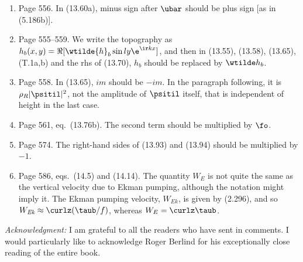 \documentclass[10pt]{article}
\newcommand{\eq}{eq.\ } \newcommand{\Eq}{Eq.\ }
\begin{document}
\begin{enumerate}

\item Page 556. In  (13.60a), minus sign after $\ubar$ should be plus sign [as in (5.186b)].

\item Page 555--559. We write the topography as $h_b(x,y)= \Re [ \wtilde{h}_b \sin ly \e^{\ir kx} ]$, and then in (13.55), (13.58), (13.65), (T.1a,b) and the rhs of (13.70), $h_b$ should be replaced by $\wtilde h_b$.

\item Page 558. In (13.65), $im$ should be $-im$. In the paragraph following,
   it is $\rho_R |\psitil|^2$, not the amplitude of $\psitil$ itself, that is independent of height in the last case. 

\item Page 561, \eq (13.76b). The second term should be multiplied by $\fo$. 

\item Page 574. The right-hand sides of (13.93) and (13.94) should be multiplied by $-1$.

\item Page 586, eqs.\ (14.5) and (14.14). The quantity $W_E$ is not quite the same as the vertical velocity due to Ekman pumping, although the notation might imply it. The Ekman pumping velocity, $W_{\textit{Ek}}$, is given by (2.296), and so $W_{\textit{Ek}} \approx \curlz (\taub/f)$, whereas $W_E = \curlz \taub$.  
 


\end{enumerate}

\noindent \textit{Acknowledgment:} I am grateful to all the readers who have sent in comments. I would particularly like to acknowledge Roger Berlind for his exceptionally close reading of the entire book.
\end{document}
